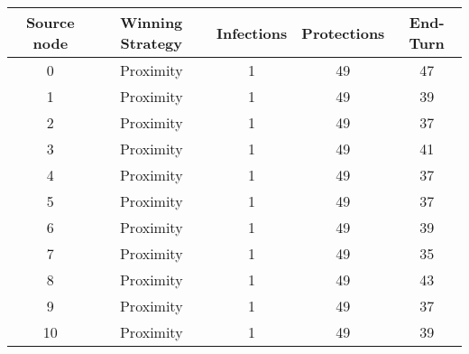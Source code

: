 \documentclass[results.tex]{subfiles}
\begin{document}
    \begin{center}
        \begin{tabular}{| c || c | c | c | c |}
            \hline
            {\bfseries Source node} & {\bfseries Winning Strategy} & {\bfseries Infections} & {\bfseries Protections}
            & {\bfseries End-Turn}
            \\  %
            \hline\hline
            0                       & Proximity                    & 1                      & 49                      & 47                   \\
            \hline
            1                       & Proximity                    & 1                      & 49                      & 39                   \\
            \hline
            2                       & Proximity                    & 1                      & 49                      & 37                   \\
            \hline
            3                       & Proximity                    & 1                      & 49                      & 41                   \\
            \hline
            4                       & Proximity                    & 1                      & 49                      & 37                   \\
            \hline
            5                       & Proximity                    & 1                      & 49                      & 37                   \\
            \hline
            6                       & Proximity                    & 1                      & 49                      & 39                   \\
            \hline
            7                       & Proximity                    & 1                      & 49                      & 35                   \\
            \hline
            8                       & Proximity                    & 1                      & 49                      & 43                   \\
            \hline
            9                       & Proximity                    & 1                      & 49                      & 37                   \\
            \hline
            10                      & Proximity                    & 1                      & 49                      & 39                   \\

\end{tabular}
\end{center}
\end{document}
